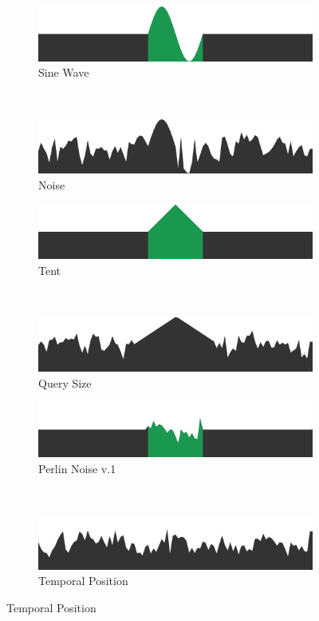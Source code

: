 {\begin{figure}
		\begin{subfigure}[t]{.45\columnwidth}
			\includegraphics[width=\textwidth]{./figures/targets/2}
			\caption{Sine Wave}
		\end{subfigure}
		~
		\begin{subfigure}[t]{.45\columnwidth}
			\includegraphics[width=\textwidth]{./figures/targets/2_n}
			\caption{Noise}
		    \label{fig:noisetarget}
		\end{subfigure}	

		\begin{subfigure}[t]{.45\columnwidth}
			\includegraphics[width=\textwidth]{./figures/targets/3}
			\caption{Tent}
		\end{subfigure}
		~
		\begin{subfigure}[t]{.45\columnwidth}
			\includegraphics[width=\textwidth]{./figures/targets/3_s}
			\caption{Query Size}
		\end{subfigure}	
			
		\begin{subfigure}[t]{.45\columnwidth}
			\includegraphics[width=\textwidth]{./figures/targets/4}
			\caption{Perlin Noise v.1}
		\end{subfigure}
		~
		\begin{subfigure}[t]{.45\columnwidth}
			\includegraphics[width=\textwidth]{./figures/targets/4_t}
			\caption{Temporal Position}
		\end{subfigure}	
		

\end{figure}}
